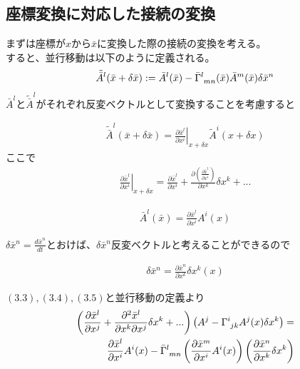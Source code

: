 \documentclass[dvipdfmx]{report} %
\begin{document}
\subsection{
	座標変換に対応した接続の変換
}
まずは座標が$x$から$\bar x$に変換した際の接続の変換を考える。\\
すると、並行移動は以下のように定義される。
$$
\tilde{ \bar{A} }^{l} (\bar{x}+\delta \bar{x}) := \bar{A}^{l}(\bar{x}) - \tensor{ \bar{\Gamma} }{^l_{mn}}(\bar{x}) \bar{A}^{m}(\bar{x}) \delta \bar{x}^{n}
$$
$\bar{A}^l$と$\tilde{ \bar{A} }^l$がそれぞれ反変ベクトルとして変換することを考慮すると
\begin{tcolorbox}
\begin{eqnarray}
\tilde{ \bar{A} }^{l} (\bar{x}+\delta \bar{x}) = \left. \frac{\partial \bar{x}^l }{ \partial x^i } \right|_{x+\delta x} \tilde{A}^i(x+\delta x)
\end{eqnarray}
ここで
\begin{eqnarray*}
\left. \frac{\partial \bar{x}^l }{ \partial x^i } \right|_{x+\delta x} = \frac{ \partial \bar{x}^l }{ \partial x^i } + \frac{ \partial \left( \frac{ \partial \bar{x}^l }{ \partial x^i } \right)  }{ \partial x^k }\delta x^k + ...
\end{eqnarray*}
\end{tcolorbox}
\begin{tcolorbox}
\begin{eqnarray}
\bar{A}^{l} (\bar{x}) = \frac{\partial \bar{x}^l }{ \partial x^i } A^i(x)
\end{eqnarray}
\end{tcolorbox}
$\delta \bar{x}^n = \frac{d\bar{x}^n}{dt}$とおけば、$\delta \bar{x}^n$反変ベクトルと考えることができるので
\begin{tcolorbox}
\begin{eqnarray}
\delta \bar{x}^n = \frac{\partial \bar{x}^n}{\partial x^k} \delta x^k(x)
\end{eqnarray}
\end{tcolorbox}
$(3.3),(3.4),(3.5)$と並行移動の定義より\\
\begin{eqnarray*}
\left( \frac{ \partial \bar{x}^l }{ \partial x^j } + \frac{ \partial^2 \bar{x}^l }{ \partial x^k \partial x^j }\delta x^k + ... \right) \left( A^j - \tensor{\Gamma}{^i_{jk}} A^j(x) \delta x^k \right) = \\
\frac{ \partial \bar{x}^l }{ \partial x^i }A^i(x) - \tensor{\bar{ \Gamma }}{^l_{mn}} \left( \frac{\partial \bar{x}^m}{\partial x^i} A^i(x) \right) \left( \frac{\partial \bar{x}^n}{\partial x^k} \delta x^k \right)
\end{eqnarray*}
\end{document}
